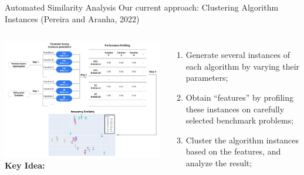 \documentclass[aspectratio=169]{beamer}
\begin{document}
\begin{frame}{Automated Similarity Analysis}
  {Our current approach: Clustering Algorithm Instances (Pereira and Aranha, 2022)}
  

  \begin{columns}
    \includegraphics[width=1\textwidth]{img/algo_cluster_flow.png}
           {\bf Key Idea:}
    \begin{enumerate}
    \item Generate several instances of each algorithm by varying their parameters;
    \item Obtain ``features'' by profiling these instances on
      carefully selected benchmark problems;
    \item Cluster the algorithm instances based on the features, and analyze the result;
    \end{enumerate}    
  \end{columns}
\end{frame}
\end{document}
